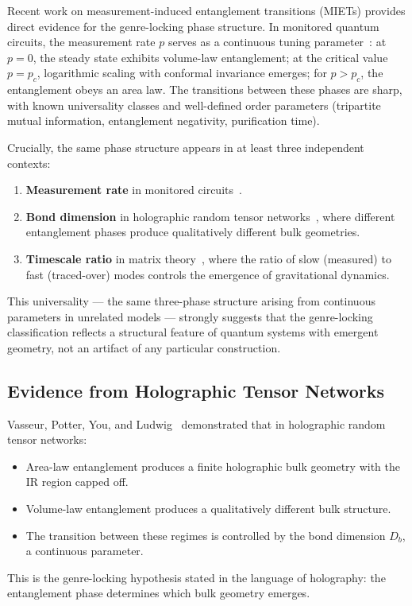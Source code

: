 \documentclass[aps,prd,twocolumn,superscriptaddress,nofootinbib,floatfix]{revtex4-2}
\begin{document}
Recent work on measurement-induced entanglement transitions (MIETs) provides direct evidence for the genre-locking phase structure. In monitored quantum circuits, the measurement rate $p$ serves as a continuous tuning parameter~\cite{LiChenFisher2018,GranetNahum2023}: at $p = 0$, the steady state exhibits volume-law entanglement; at the critical value $p = p_c$, logarithmic scaling with conformal invariance emerges; for $p > p_c$, the entanglement obeys an area law. The transitions between these phases are sharp, with known universality classes and well-defined order parameters (tripartite mutual information, entanglement negativity, purification time).

Crucially, the same phase structure appears in at least three independent contexts:
\begin{enumerate}
\item \textbf{Measurement rate} in monitored circuits~\cite{LiChenFisher2018,GranetNahum2023}.
\item \textbf{Bond dimension} in holographic random tensor networks~\cite{VasseurPotterYouLudwig2019}, where different entanglement phases produce qualitatively different bulk geometries.
\item \textbf{Timescale ratio} in matrix theory~\cite{Sahakian2025}, where the ratio of slow (measured) to fast (traced-over) modes controls the emergence of gravitational dynamics.
\end{enumerate}

This universality --- the same three-phase structure arising from continuous parameters in unrelated models --- strongly suggests that the genre-locking classification reflects a structural feature of quantum systems with emergent geometry, not an artifact of any particular construction.

\subsection{Evidence from Holographic Tensor Networks}

Vasseur, Potter, You, and Ludwig~\cite{VasseurPotterYouLudwig2019} demonstrated that in holographic random tensor networks:
\begin{itemize}
\item Area-law entanglement produces a finite holographic bulk geometry with the IR region capped off.
\item Volume-law entanglement produces a qualitatively different bulk structure.
\item The transition between these regimes is controlled by the bond dimension $D_b$, a continuous parameter.
\end{itemize}
This is the genre-locking hypothesis stated in the language of holography: the entanglement phase determines which bulk geometry emerges.
\end{document}
